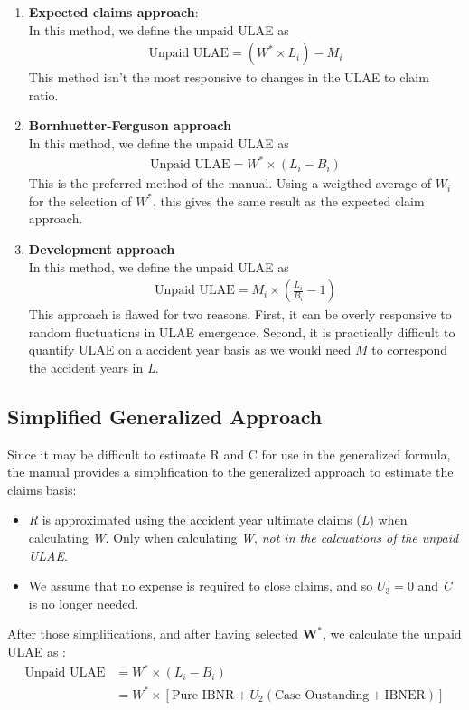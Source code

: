 \documentclass[11pt, english]{memoir}
\numberwithin{definition}{section}
\begin{document}
	\begin{enumerate}
		\item \textbf{Expected claims approach}:\\
		In this method, we define the unpaid ULAE as
		\begin{align*}
		\text{Unpaid ULAE} = (W^{*} \times L_{i}) - M_{i}
		\end{align*}
		This method isn't the most responsive to changes in the ULAE to claim ratio.\\
		
		
		\item \textbf{Bornhuetter-Ferguson approach}\\
		In this method, we define the unpaid ULAE as
		\begin{align*}
		\text{Unpaid ULAE} = W^{*} \times (L_{i} - B_{i})
		\end{align*}
		This is the preferred method of the manual. Using a weigthed average of $ W_{i} $ for the selection of $ W^{*} $, this gives the same result as the expected claim approach. \\
		
		
		\item \textbf{Development approach}\\
		In this method, we define the unpaid ULAE as
		\begin{align*}
		\text{Unpaid ULAE} = M_{i}\times (\frac{L_{i}}{B_{i}} - 1)
		\end{align*}
		This approach is flawed for two reasons. First, it can be overly responsive to random fluctuations in ULAE emergence. Second, it is practically difficult to quantify ULAE on a accident year basis as we would need $ M $ to correspond the accident years in \emph{L}.
	\end{enumerate}





\subsection{Simplified Generalized Approach}	
	Since it may be difficult to estimate R and C for use in the generalized formula, the manual provides a simplification to the generalized approach to estimate the claims basis:
	\begin{itemize}
		\item \emph{R} is approximated using the accident year ultimate claims (\emph{L}) when calculating \emph{W}. Only when calculating \emph{W}, \emph{not in the calcuations of the unpaid ULAE}. 
		\item We assume that no expense is required to close claims, and so $ U_{3} = 0$ and \emph{C} is no longer needed. 
	\end{itemize}
	After those simplifications, and after having selected $ \mathbf{W^{*}} $, we calculate the unpaid ULAE as :
	\begin{align*}
	\text{Unpaid ULAE} &=  W^{*} \times (L_{i} - B_{i})\\
	&= W^{*} \times \left[ \text{Pure IBNR} + U_{2}(\text{Case Oustanding} + \text{IBNER})\right]
	\end{align*}
	
\end{document}
